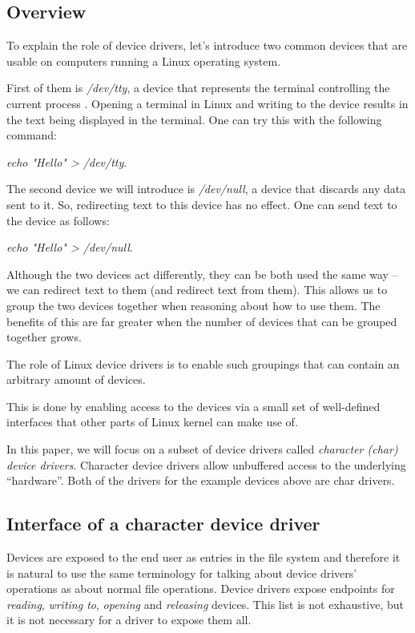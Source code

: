\documentclass[..thesis.tex]{subfiles}
\begin{document}
\subsection{Overview}


To explain the role of device drivers, let's introduce two common devices that are usable on computers running a Linux operating system.

First of them is \textit{/dev/tty}, a device that represents the terminal controlling the current process \cite{torvalds_linux}. Opening a terminal in Linux and writing to the device results in the text being displayed in the terminal. One can try this with the following command: 

\textit{echo "Hello" > /dev/tty}.
 
The second device we will introduce is \textit{/dev/null}, a device that discards any data sent to it. So, redirecting text to this device has no effect.
One can send text to the device as follows:

\textit{echo "Hello" > /dev/null}.

Although the two devices act differently, they can be both used the same way -- we can redirect text to them (and redirect text from them). This allows us to group the two devices together when reasoning about how to use them. The benefits of this are far greater when the number of devices that can be grouped together grows.

The role of Linux device drivers is to enable such groupings that can contain an arbitrary amount of devices.

This is done by enabling access to the devices via a small set of well-defined interfaces that other parts of Linux kernel can make use of. 

In this paper, we will focus on a subset of device drivers called \textit{character (char) device drivers}. Character device drivers allow unbuffered access to the underlying ``hardware''. Both of the drivers for the example devices above are char drivers.

\subsection{Interface of a character device driver}

Devices are exposed to the end user as entries in the file system and therefore it is natural to use the same terminology for talking about device drivers' operations as about normal file operations. Device drivers expose endpoints for \textit{reading}, \textit{writing to}, \textit{opening} and \textit{releasing} devices. This list is not exhaustive\cite[include/linux/fs.h]{torvalds_linux}, but it is not necessary for a driver to expose them all.
\end{document}
